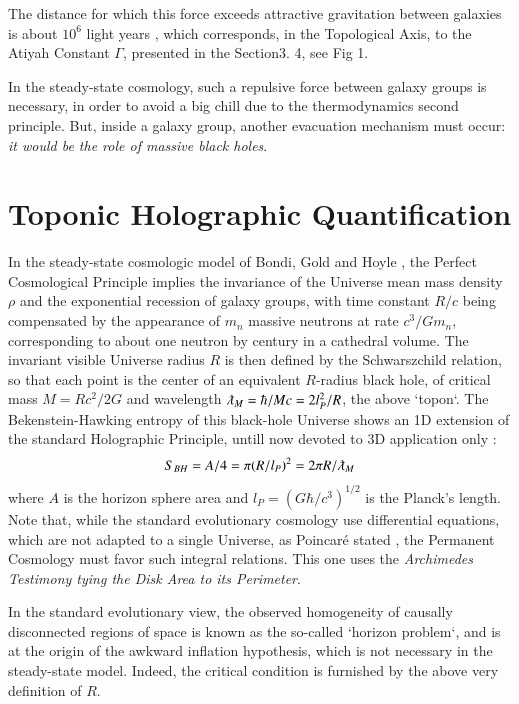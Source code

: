 \documentclass[twoside,draft]{article}
\begin{document}
\begin{sloppypar}
The distance for which this force exceeds attractive
gravitation between galaxies is about $10^{6}$ light years \cite{Sanchez1}, which corresponds, in the Topological
Axis, to the Atiyah Constant $\Gamma$, presented in the Section3. 4, see Fig 1.

In the steady-state cosmology, such a repulsive force between galaxy groups is necessary, in
order to avoid a big chill due to the thermodynamics second principle. But, inside a galaxy group,
another evacuation mechanism must occur: \textit{it would be the role of massive black holes}.

\section{Toponic Holographic Quantification}

In the steady-state cosmologic model of Bondi, Gold and Hoyle \cite{Sanchez1}, the Perfect Cosmological
Principle implies the invariance of the Universe mean mass density $\rho$ and the exponential recession
of galaxy groups, with time constant $R/c$ being compensated by the appearance of $m_n$ massive
neutrons at rate $c^{3} /Gm_{n}$, corresponding to about one neutron by century in a cathedral volume. The invariant visible Universe radius $R$ is then defined by the
Schwarszchild relation, so that each point is the center of an equivalent $R$-radius black hole, of
critical mass $M = Rc^{2} /2G$ and wavelength $\lambdabar_M = \hbar/Mc = 2l_{P}^{2} /R$, the above `topon`. The Bekenstein-Hawking entropy of this black-hole Universe shows an 1D extension of the standard Holographic
Principle, untill now devoted to 3D application only \cite{Bousso}:
\begin{equation}
S_{BH} = A/4 = \pi(R/l_{P})^{2} = 2\pi R/\lambdabar_{M}
\end{equation}
where $A$ is the horizon sphere area and $l_{P} = (G\hbar/c^{3} )^{1/2}$ is the Planck's length. Note that, while the standard evolutionary cosmology use differential equations, which are not adapted to a single Universe, as Poincar\'{e} stated \cite{Sanchez1}, the Permanent Cosmology must favor such integral relations. This one
uses the \textit{Archimedes Testimony tying the Disk Area to its Perimeter}.

In the standard evolutionary view, the observed homogeneity of causally disconnected regions
of space is known as the so-called `horizon problem`, and is at the origin of the awkward inflation
hypothesis, which is not necessary in the steady-state model. Indeed, the critical condition is
furnished by the above very definition of $R$.


\end{sloppypar}
\end{document}
